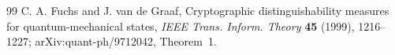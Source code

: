 \begin{thebibliography}{99}
 C. A. Fuchs and J. van de Graaf,
Cryptographic distinguishability measures for quantum-mechanical states,
\emph{IEEE Trans. Inform. Theory} \textbf{45} (1999), 1216--1227;
arXiv:quant-ph/9712042, Theorem~1.
\end{thebibliography}
